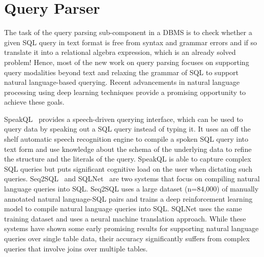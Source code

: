 \section{Query Parser}
The task of the query parsing sub-component in a DBMS is to check whether a given SQL query in text format is free from syntax and grammar errors and if so translate it into a relational algebra expression, which is an already solved problem!
Hence, most of the new work on query parsing focuses on supporting query modalities beyond text and relaxing the grammar of SQL to support natural language-based querying.
Recent advancements in natural language processing using deep learning techniques provide a promising opportunity to achieve these goals.

SpeakQL~\cite{speakql} provides a speech-driven querying interface, which can be used to query data by speaking out a SQL query instead of typing it.
It uses an off the shelf automatic speech recognition engine to compile a spoken SQL query into text form and use knowledge about the schema of the underlying data to refine the structure and the literals of the query.
SpeakQL is able to capture complex SQL queries but puts significant cognitive load on the user when dictating such queries.
Seq2SQL~\cite{seq2sql} and SQLNet~\cite{sqlnet} are two systems that focus on compiling natural language queries into SQL.
Seq2SQL uses a large dataset (n=84,000) of manually annotated natural language-SQL pairs and trains a deep reinforcement learning model to compile natural language queries into SQL.
SQLNet uses the same training dataset and uses a neural machine translation approach.
While these systems have shown some early promising results for supporting natural language queries over single table data, their accuracy significantly suffers from complex queries that involve joins over multiple tables.